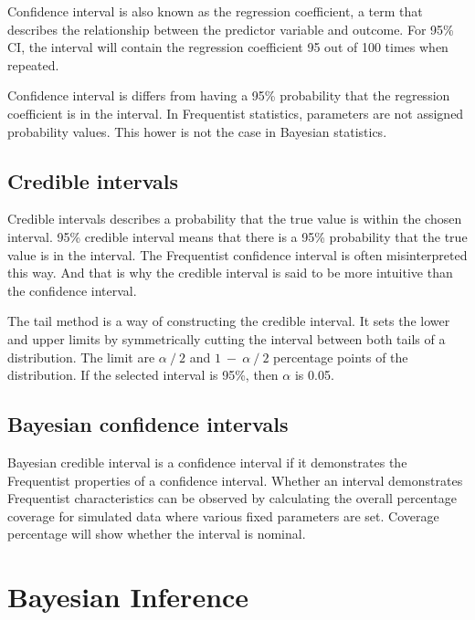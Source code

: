 Confidence interval is also known as the regression coefficient, a term that describes the relationship between the predictor variable and outcome.\cite{RegressionCoefficients} For 95\% CI, the interval will contain the regression coefficient 95 out of 100 times when repeated.\cite{Schoot2014BayesianA} 

Confidence interval is differs from having a 95\% probability that the regression coefficient is in the interval. In Frequentist statistics, parameters are not assigned probability values. \cite{FornaconWood2022UnderstandingTD} This hower is not the case in Bayesian statistics.

\subsection{Credible intervals}\label{CredibilityIntervals}

Credible intervals describes a probability that the true value is within the chosen interval. 95\% credible interval means that there is a 95\% probability that the true value is in the interval. The Frequentist confidence interval is often misinterpreted this way. And that is why the credible interval is said to be more intuitive than the confidence interval.\cite{FornaconWood2022UnderstandingTD} 

The tail method is a way of constructing the credible interval. It sets the lower and upper limits by symmetrically cutting the interval between both tails of a distribution. The limit are $\alpha\ /\ 2$ and $1\ -\ \alpha\ /\ 2$ percentage points of the distribution. If the selected interval is 95\%, then $\alpha$ is 0.05. \cite{Shi2009BayesianCI}

\subsection{Bayesian confidence intervals}\label{BayesianConfidenceIntervals}

Bayesian credible interval is a confidence interval if it demonstrates the Frequentist properties of a confidence interval. Whether an interval demonstrates Frequentist characteristics can be observed by calculating the overall percentage coverage for simulated data where various fixed parameters are set. \cite{Pirikahu2016BayesianMO} \cite{Shi2009BayesianCI} Coverage percentage will show whether the interval is nominal. \cite{Pirikahu2016BayesianMO} 

\section{Bayesian Inference}\label{BayesianInference}


